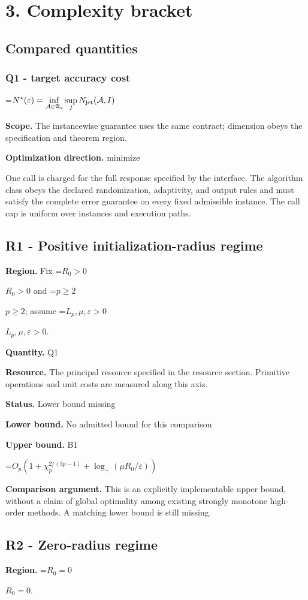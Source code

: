\documentclass[10pt,a4paper]{article}
\newcommand{\AtlasMath}[1]{\par\begingroup\centering\setbox0=\hbox{$\displaystyle #1$}\ifdim\wd0>1.4\linewidth\typeout{ATLAS WIDE FORMULA: \the\wd0}\fi\ifdim\wd0>\linewidth\resizebox{\linewidth}{!}{\box0}\else\box0\fi\par\endgroup}
\newcommand{\AtlasInlineMath}[1]{\begingroup\setbox0=\hbox{$#1$}\ifdim\wd0>.4\linewidth\endgroup\AtlasMath{#1}\else\endgroup$#1$\fi}
\begin{document}
\section{3. Complexity bracket}
\subsection{Compared quantities}
\subsubsection{Q1 - target accuracy cost}
\AtlasMath{N^\star(\varepsilon)=\inf_{\mathcal A\in\mathfrak A_\varepsilon}\sup_I N_{\rm jet}(\mathcal A,I)}
\textbf{Scope.} The instancewise guarantee uses the same contract; dimension obeys the specification and theorem region.

\textbf{Optimization direction.} minimize

One call is charged for the full response specified by the interface. The algorithm class obeys the declared randomization, adaptivity, and output rules and must satisfy the complete error guarantee on every fixed admissible instance. The call cap is uniform over instances and execution paths.

\subsection{R1 - Positive initialization-radius regime}
\textbf{Region.} Fix \AtlasInlineMath{R_0>0} and \AtlasInlineMath{p\ge2}; assume \AtlasInlineMath{L_p,\mu,\varepsilon>0}.

\textbf{Quantity.} Q1

\textbf{Resource.} The principal resource specified in the resource section. Primitive operations and unit costs are measured along this axis.

\textbf{Status.} Lower bound missing

\textbf{Lower bound.} No admitted bound for this comparison

\textbf{Upper bound.} B1

\AtlasMath{O_p\!\left(1+\chi_p^{2/(3p-1)}+\log_+(\mu R_0/\varepsilon)\right)}
\textbf{Comparison argument.} This is an explicitly implementable upper bound, without a claim of global optimality among existing strongly monotone high-order methods. A matching lower bound is still missing.

\subsection{R2 - Zero-radius regime}
\textbf{Region.} \AtlasInlineMath{R_0=0}.
\end{document}
